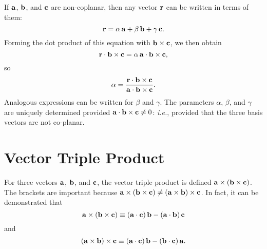 If ${\bf a}$, ${\bf b}$, and ${\bf c}$ are non-coplanar, then any vector ${\bf r}$ can be
written in terms of them:
\begin{equation}
{\bf r} = \alpha \,{\bf a} + \beta\,{\bf b} + \gamma\, {\bf c}.
\end{equation}
Forming the dot product of this equation with ${\bf b}\times{\bf c}$, we then obtain
\begin{equation}
{\bf r}  \cdot {\bf b} \times{\bf c} = \alpha\, {\bf a}\cdot{\bf b} \times{\bf c},
\end{equation}
so
\begin{equation}
\alpha = \frac{{\bf r}\cdot{\bf b}\times{\bf c}}{{\bf a}\cdot{\bf b}\times{\bf c}}.
\end{equation}
Analogous expressions can be written for $\beta$ and $\gamma$. The parameters $\alpha$, $\beta$,
and $\gamma$ are uniquely determined provided $ {\bf a}\cdot{\bf b} \times{\bf c} \neq 0$:
{\em i.e.}, provided that the three basis vectors are not co-planar. 

\section{Vector Triple Product}
For three vectors ${\bf a}$, ${\bf b}$, and ${\bf c}$, the vector triple product is defined
${\bf a}\times({\bf b} \times {\bf c})$. The brackets are important because
${\bf a}\times({\bf b} \times {\bf c}) \neq ({\bf a}\times{\bf b} )\times {\bf c}$. 
In fact, it can be demonstrated that
\begin{equation}
{\bf a}\times({\bf b} \times {\bf c}) \equiv ({\bf a}\cdot {\bf c}) \,{\bf b} - ({\bf a}\cdot
{\bf b})\,{\bf c}\label{e247}
\end{equation}
and
\begin{equation}
({\bf a}\times{\bf b}) \times {\bf c}\equiv ({\bf a}\cdot {\bf c}) \,{\bf b} - ({\bf b}\cdot
{\bf c})\,{\bf a}.
\end{equation}

